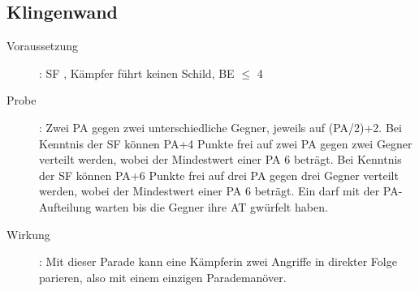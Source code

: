 \subsection{Klingenwand}
\label{reaktion.klingenwand}
\begin{description}
    \item[Voraussetzung]: SF , Kämpfer führt keinen Schild, BE\textrm{ ${\leq}$ }4
    \item[Probe]:
        Zwei PA gegen zwei unterschiedliche Gegner, jeweils auf (PA/2)+2.\newline
        Bei Kenntnis der SF  können PA+4 Punkte frei auf zwei PA gegen zwei Gegner verteilt werden, wobei der Mindestwert einer PA 6 beträgt.\newline
        Bei Kenntnis der SF  können PA+6 Punkte frei auf drei PA gegen drei Gegner verteilt werden, wobei der Mindestwert einer PA 6 beträgt.\newline
        Ein  darf mit der PA-Aufteilung warten bis die Gegner ihre AT gwürfelt haben.
    \item[Wirkung]:
        Mit dieser Parade kann eine Kämpferin zwei Angriffe in direkter Folge parieren, also mit einem einzigen Parademanöver.
\end{description}
